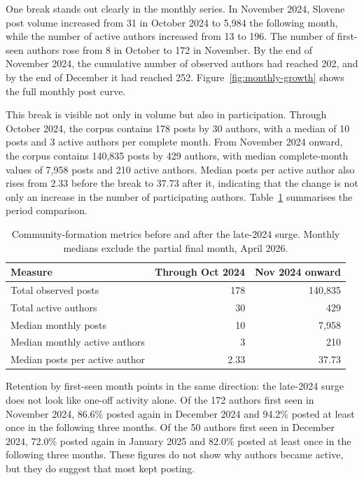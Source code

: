 One break stands out clearly in the monthly series. In November 2024, Slovene post volume increased from 31 in October 2024 to 5,984 the following month, while the number of active authors increased from 13 to 196. The number of first-seen authors rose from 8 in October to 172 in November. By the end of November 2024, the cumulative number of observed authors had reached 202, and by the end of December it had reached 252. Figure~\ref{fig:monthly-growth} shows the full monthly post curve.

This break is visible not only in volume but also in participation. Through October 2024, the corpus contains 178 posts by 30 authors, with a median of 10 posts and 3 active authors per complete month. From November 2024 onward, the corpus contains 140,835 posts by 429 authors, with median complete-month values of 7,958 posts and 210 active authors. Median posts per active author also rises from 2.33 before the break to 37.73 after it, indicating that the change is not only an increase in the number of participating authors. Table~\ref{tab:community-periods} summarises the period comparison.

\begin{table}[htbp]
\caption{Community-formation metrics before and after the late-2024 surge. Monthly medians exclude the partial final month, April 2026.}
\label{tab:community-periods}
\centering
\begin{tabularx}{\linewidth}{Xrr}
\toprule
Measure & Through Oct 2024 & Nov 2024 onward \\
\midrule
Total observed posts & 178 & 140,835 \\
Total active authors & 30 & 429 \\
Median monthly posts & 10 & 7,958 \\
Median monthly active authors & 3 & 210 \\
Median posts per active author & 2.33 & 37.73 \\
\bottomrule
\end{tabularx}
\end{table}

Retention by first-seen month points in the same direction: the late-2024 surge does not look like one-off activity alone. Of the 172 authors first seen in November 2024, 86.6\% posted again in December 2024 and 94.2\% posted at least once in the following three months. Of the 50 authors first seen in December 2024, 72.0\% posted again in January 2025 and 82.0\% posted at least once in the following three months. These figures do not show why authors became active, but they do suggest that most kept posting.


